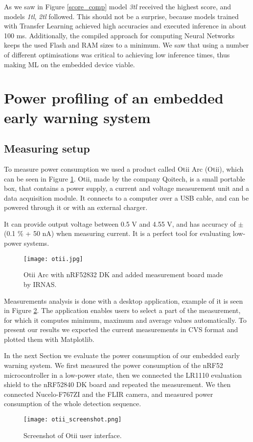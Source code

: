 As we saw in Figure \ref{score_comp} model \textit{3tl} received the highest score, and models \textit{1tl}, \textit{2tl} followed.
This should not be a surprise, because models trained with Transfer Learning achieved high accuracies and executed inference in about 100 \si{\milli\second}. 
Additionally, the compiled approach for computing Neural Networks keeps the used Flash and RAM sizes to a minimum.
We saw that using a number of different optimisations was critical to achieving low inference times, thus making ML on the embedded device viable.

\section{ Power profiling of an embedded early warning system}

\subsection{ Measuring setup}

To measure power consumption we used a product called Otii Arc (Otii), which can be seen in Figure \ref{otii}.
Otii, made by the company Qoitech, is a small portable box, that contains a power supply, a current and voltage measurement unit and a data acquisition module.
It connects to a computer over a USB cable, and can be powered through it or with an external charger.

It can provide output voltage between 0.5 V and 4.55 V, and has accuracy of $\pm$(0.1 \% + 50 nA) when measuring current.
It is a perfect tool for evaluating low-power systems.
\newline
\begin{figure}[ht]
    \centering
    \texttt{[image: otii.jpg]}
    \caption{ Otii Arc with nRF52832 DK and added measurement board made by IRNAS.}
    \label{otii}
\end{figure}

Measurements analysis is done with a desktop application, example of it is seen in Figure \ref{otii_screen}. 
The application enables users to select a part of the measurement, for which it computes minimum, maximum and average values automatically.
To present our results we exported the current measurements in CVS format and plotted them with Matplotlib.

In the next Section we evaluate the power consumption of our embedded early warning system.
We first measured the power consumption of the nRF52 microcontroller in a low-power state, then we connected the LR1110 evaluation shield to the nRF52840 DK board and repeated the measurement.
We then connected Nucelo-F767ZI and the FLIR camera, and measured power consumption of the whole detection sequence.
\begin{figure}[ht]
    \centering
    \texttt{[image: otii\_screenshot.png]}
    \caption{ Screenshot of Otii user interface.}
    \label{otii_screen}
\end{figure}

